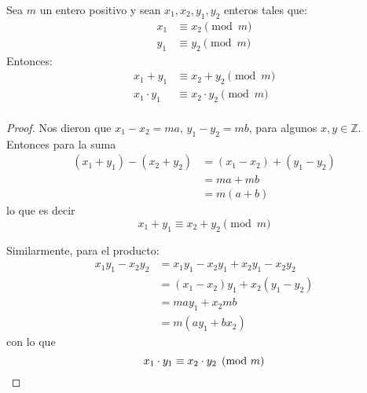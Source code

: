   \begin{theorem}
    \label{theo:+*mod}
    Sea \(m\) un entero positivo
    y sean \(x_1, x_2, y_1, y_2\) enteros tales que:
    \begin{align*}
      x_1
	&\equiv x_2 \pmod{m} \\
      y_1
	&\equiv y_2 \pmod{m}
    \end{align*}
    Entonces:
    \begin{align*}
      x_1 + y_1
	&\equiv x_2 + y_2 \pmod{m} \\
      x_1 \cdot y_1
	&\equiv x_2 \cdot y_2 \pmod{m} \\
    \end{align*}
  \end{theorem}
  \begin{proof}
    Nos dieron que
    \(x_1 - x_2 = m a\),
    \(y_1 - y_2 = m b\),
    para algunos \(x, y \in \mathbb{Z}\).
    Entonces para la suma
    \begin{align*}
      (x_1 + y_1) - (x_2 + y_2)
	&= (x_1 - x_2) + (y_1 - y_2) \\
	&= m a + m b \\
	&= m (a + b)
    \end{align*}
    lo que es decir
    \begin{equation*}
      x_1 + y_1
	\equiv x_2 + y_2 \pmod{m}
    \end{equation*}

    Similarmente,
    para el producto:
    \begin{align*}
      x_1 y_1 - x_2 y_2
	&= x_1 y_1 - x_2 y_1 + x_2 y_1 - x_2 y_2 \\
	&= (x_1 - x_2) y_1 + x_2 (y_1 -y_2) \\
	&= m a y_1 + x_2 m b \\
	&= m (a y_1 + b x_2)
    \end{align*}
    con lo que
    \begin{equation*}
      x_1 \cdot y_1 \equiv x_2 \cdot y_2 \pmod{m}
      \qedhere
    \end{equation*}
  \end{proof}


